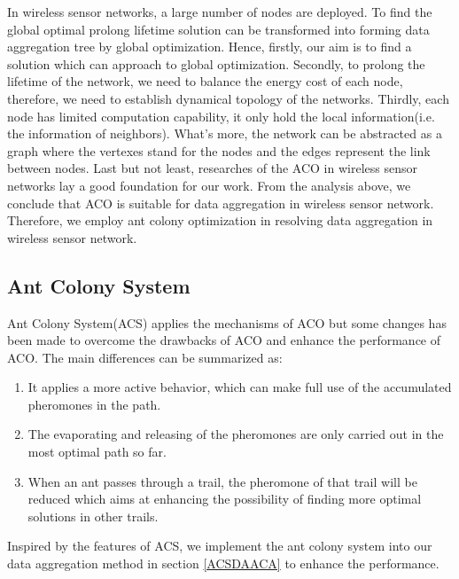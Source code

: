 \documentclass{elsarticle}
\begin{document}
In wireless sensor networks, a large number of nodes are deployed. To find the global optimal prolong lifetime solution can be transformed into forming data aggregation tree by global optimization. Hence, firstly, our aim is to find a solution which can approach to global optimization. Secondly, to prolong the lifetime of the network, we need to balance the energy cost of each node, therefore, we need to establish dynamical topology of the networks. Thirdly, each node has limited computation capability, it only hold the local information(i.e. the information of neighbors). What's more, the network can be abstracted as a graph where the vertexes stand for the nodes and the edges represent the link between nodes. Last but not least, researches of the ACO in wireless sensor networks\cite{label-10,label-42,label-43} lay a good foundation for our work. From the analysis above, we conclude that ACO is suitable for data aggregation in wireless sensor network. Therefore, we employ ant colony optimization in resolving data aggregation in wireless sensor network.

\subsection{Ant Colony System} \label{AntColonySystem}
Ant Colony System(ACS) applies the mechanisms of ACO but some changes has been made to overcome the drawbacks of ACO and enhance the performance of ACO.
The main differences can be summarized as:
\begin{enumerate}
\item It applies a more active behavior, which can make full use of the accumulated pheromones in the path.
\item The evaporating and releasing of the pheromones are only carried out in the most optimal path so far.
\item When an ant passes through a trail, the pheromone of that trail will be reduced which aims at enhancing the possibility of finding more optimal solutions in other trails.
\end{enumerate}

Inspired by the features of ACS, we implement the ant colony system into our data aggregation method in section \ref{ACSDAACA} to enhance the performance.
\end{document}
